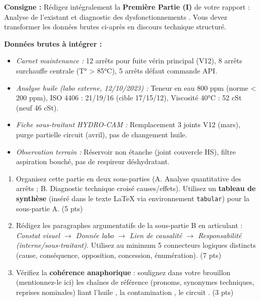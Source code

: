\documentclass[11pt]{article}
\begin{document}
\begin{exercice}
\textbf{Consigne :} Rédigez intégralement la \textbf{Première Partie (I)} de votre rapport : \og Analyse de l'existant et diagnostic des dysfonctionnements \fg. Vous devez transformer les données brutes ci-après en discours technique structuré.

\textbf{Données brutes à intégrer :}
\begin{itemize}
    \item \textit{Carnet maintenance :} 12 arrêts pour \og fuite vérin principal\fg{} (V12), 8 arrêts \og surchauffe centrale\fg{} (T° > 85°C), 5 arrêts \og défaut commande API\fg{}.
    \item \textit{Analyse huile (labo externe, 12/10/2023) :} Teneur en eau 800 ppm (norme < 200 ppm), ISO 4406 : 21/19/16 (cible 17/15/12), Viscosité 40°C : 52 cSt (neuf 46 cSt).
    \item \textit{Fiche sous-traitant HYDRO-CAM :} Remplacement 3 joints V12 (mars), purge partielle circuit (avril), pas de changement huile.
    \item \textit{Observation terrain :} Réservoir non étanche (joint couvercle HS), filtre aspiration bouché, pas de respireur déshydratant.
\end{itemize}

\begin{enumerate}
    \item Organisez cette partie en deux sous-parties (A. Analyse quantitative des arrêts ; B. Diagnostic technique croisé causes/effets). Utilisez un \textbf{tableau de synthèse} (inséré dans le texte LaTeX via environnement \texttt{tabular}) pour la sous-partie A. (5 pts)
    \item Rédigez les paragraphes argumentatifs de la sous-partie B en articulant : \textit{Constat visuel $\rightarrow$ Donnée labo $\rightarrow$ Lien de causalité $\rightarrow$ Responsabilité (interne/sous-traitant).} Utilisez au minimum 5 connecteurs logiques distincts (cause, conséquence, opposition, concession, énumération). (7 pts)
    \item Vérifiez la \textbf{cohérence anaphorique} : soulignez dans votre brouillon (mentionnez-le ici) les chaînes de référence (pronoms, synonymes techniques, reprises nominales) liant \og l'huile \fg{}, \og la contamination \fg{}, \og le circuit \fg{}. (3 pts)
\end{enumerate}
\end{exercice}
\end{document}
